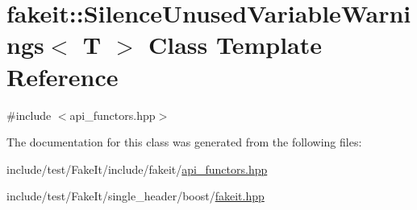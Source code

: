 \hypertarget{classfakeit_1_1SilenceUnusedVariableWarnings}{}\section{fakeit\+::Silence\+Unused\+Variable\+Warnings$<$ T $>$ Class Template Reference}
\label{classfakeit_1_1SilenceUnusedVariableWarnings}


{\ttfamily \#include $<$api\+\_\+functors.\+hpp$>$}



The documentation for this class was generated from the following files\+:\begin{DoxyCompactItemize}
\item 
include/test/\+Fake\+It/include/fakeit/\mbox{\hyperlink{api__functors_8hpp}{api\+\_\+functors.\+hpp}}\item 
include/test/\+Fake\+It/single\+\_\+header/boost/\mbox{\hyperlink{single__header_2boost_2fakeit_8hpp}{fakeit.\+hpp}}\end{DoxyCompactItemize}
